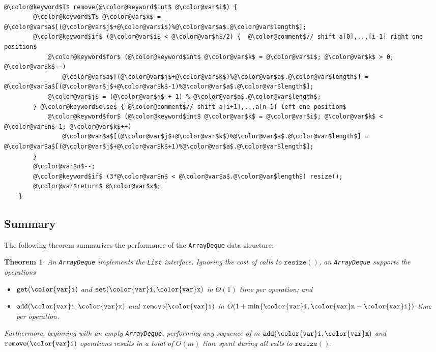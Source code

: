 \documentclass[10pt]{book}
\theoremstyle{plain}
\newtheorem{thm}{Theorem}[chapter]
\newcommand{\thmlabel}[1]{\label{thm:#1}}
\theoremstyle{definition}
\begin{document}
 \ \vspace{.5ex}\begin{Verbatim}[gobble=1,tabsize=2,frame=single,framerule=1.2pt,commandchars=\\@\$,label=\texttt{ArrayDeque},labelposition=topline]
	@\color@keyword$T$ remove(@\color@keyword$int$ @\color@var$i$) {
		@\color@keyword$T$ @\color@var$x$ = @\color@var$a$[(@\color@var$j$+@\color@var$i$)%@\color@var$a$.@\color@var$length$];
		@\color@keyword$if$ (@\color@var$i$ < @\color@var$n$/2) {  @\color@comment$// shift a[0],..,[i-1] right one position$
			@\color@keyword$for$ (@\color@keyword$int$ @\color@var$k$ = @\color@var$i$; @\color@var$k$ > 0; @\color@var$k$--)
				@\color@var$a$[(@\color@var$j$+@\color@var$k$)%@\color@var$a$.@\color@var$length$] = @\color@var$a$[(@\color@var$j$+@\color@var$k$-1)%@\color@var$a$.@\color@var$length$];
			@\color@var$j$ = (@\color@var$j$ + 1) % @\color@var$a$.@\color@var$length$;
		} @\color@keyword$else$ { @\color@comment$// shift a[i+1],..,a[n-1] left one position$
			@\color@keyword$for$ (@\color@keyword$int$ @\color@var$k$ = @\color@var$i$; @\color@var$k$ < @\color@var$n$-1; @\color@var$k$++)
				@\color@var$a$[(@\color@var$j$+@\color@var$k$)%@\color@var$a$.@\color@var$length$] = @\color@var$a$[(@\color@var$j$+@\color@var$k$+1)%@\color@var$a$.@\color@var$length$];
		}
		@\color@var$n$--;
		@\color@keyword$if$ (3*@\color@var$n$ < @\color@var$a$.@\color@var$length$) resize();
		@\color@var$return$ @\color@var$x$;
	}
\end{Verbatim}


\subsection{Summary}

The following theorem summarizes the performance of the \texttt{ArrayDeque}
data structure:
\begin{thm}\thmlabel{arraydeque}
  An \texttt{ArrayDeque} implements the \texttt{List} interface.  Ignoring the cost of
  calls to \ensuremath{\mathtt{resize()}}, an \texttt{ArrayDeque} supports the operations
  \begin{itemize}
    \item \ensuremath{\mathtt{get({\color{var}i})}} and \ensuremath{\mathtt{set({\color{var}i},{\color{var}x})}} in $O(1)$ time per operation; and
    \item \ensuremath{\mathtt{add({\color{var}i},{\color{var}x})}} and \ensuremath{\mathtt{remove({\color{var}i})}} in $O(1+\min\{\ensuremath{\mathtt{{\color{var}i}}},\ensuremath{\mathtt{{\color{var}n}}}-\ensuremath{\mathtt{{\color{var}i}}}\})$ time
          per operation.
  \end{itemize}
  Furthermore, beginning with an empty \texttt{ArrayDeque}, performing any
  sequence of $m$ \ensuremath{\mathtt{add({\color{var}i},{\color{var}x})}} and \ensuremath{\mathtt{remove({\color{var}i})}} operations results in a
  total of $O(m)$ time spent during all calls to \ensuremath{\mathtt{resize()}}.
\end{thm}
\end{document}
